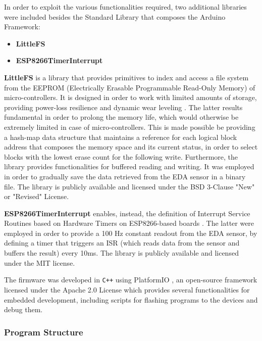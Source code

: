 In order to exploit the various functionalities required, two additional libraries were included besides the Standard Library that composes the Arduino Framework:

\begin{itemize}
    \item \textbf{LittleFS}
    \item \textbf{ESP8266TimerInterrupt}
\end{itemize}

\textbf{LittleFS} is a library that provides primitives to index and access a file system from the EEPROM (Electrically Erasable Programmable Read-Only Memory) of micro-controllers. It is designed in order to work with limited amounts of storage, providing power-loss resilience and dynamic wear leveling \cite{littlefs}. The latter results fundamental in order to prolong the memory life, which would otherwise be extremely limited in case of micro-controllers. This is made possible be providing a hash-map data structure that maintains a reference for each logical block address that composes the memory space and its current status, in order to select blocks with the lowest erase count for the following write. Furthermore, the library provides functionalities for buffered reading and writing. It was employed in order to gradually save the data retrieved from the EDA sensor in a binary file.
The library is publicly available and licensed under the BSD 3-Clause "New" or "Revised" License.

\vspace{8mm}

\textbf{ESP8266TimerInterrupt} enables, instead, the definition of Interrupt Service Routines based on Hardware Timers on ESP8266-based boards \cite{esp8266timerinterrupt}. The latter were employed in order to provide a 100 Hz constant readout from the EDA sensor, by defining a timer that triggers an ISR (which reads data from the sensor and buffers the result) every 10ms. The library is publicly available and licensed under the MIT license.

\vspace{8mm}

The firmware was developed in \texttt{C++} using PlatformIO \cite{platformio}, an open-source framework licensed under the Apache 2.0 License which provides several functionalities for embedded development, including scripts for flashing programs to the devices and debug them.

\subsubsection{Program Structure}\label{subsubsec:program-structure}

